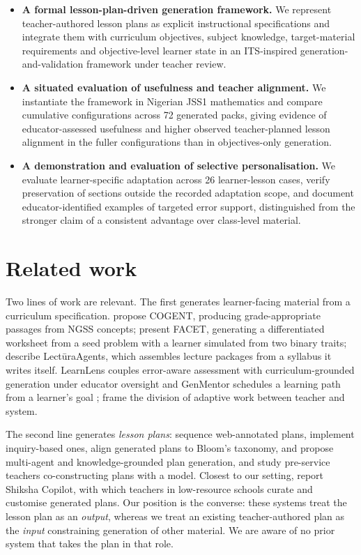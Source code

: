 \documentclass{article}
\begin{document}
\begin{itemize}\itemsep2pt
\item \textbf{A formal lesson-plan-driven generation framework.} We represent teacher-authored
lesson plans as explicit instructional specifications and integrate them with curriculum
objectives, subject knowledge, target-material requirements and objective-level learner state in
an ITS-inspired generation-and-validation framework under teacher review.
\item \textbf{A situated evaluation of usefulness and teacher alignment.} We instantiate the
framework in Nigerian JSS1 mathematics and compare cumulative configurations across 72 generated
packs, giving evidence of educator-assessed usefulness and higher observed teacher-planned
lesson alignment in the fuller configurations than in objectives-only generation.
\item \textbf{A demonstration and evaluation of selective personalisation.} We evaluate
learner-specific adaptation across 26 learner-lesson cases, verify preservation of sections
outside the recorded adaptation scope, and document educator-identified examples of targeted
error support, distinguished from the stronger claim of a consistent advantage over class-level
material.
\end{itemize}

\section{Related work}

Two lines of work are relevant. The first generates learner-facing material from a curriculum
specification. \citet{cogent} propose COGENT, producing grade-appropriate passages from NGSS
concepts; \citet{facet} present FACET, generating a differentiated worksheet from a seed problem
with a learner simulated from two binary traits; \citet{lectura} describe Lect\=uraAgents, which
assembles lecture packages from a syllabus it writes itself. LearnLens couples error-aware
assessment with curriculum-grounded generation under educator oversight \citep{zhao2025} and
GenMentor schedules a learning path from a learner's goal \citep{wang2025};
\citet{holstein2020} frame the division of adaptive work between teacher and system.

The second line generates \emph{lesson plans}: \citet{ranawat2021} sequence web-annotated
plans, \citet{moundridou2024} implement inquiry-based ones, \citet{olaniyan2025} align generated
plans to Bloom's taxonomy, \citet{zhang2025} and \citet{zheng2025} propose multi-agent and
knowledge-grounded plan generation, and \citet{celik2026} study pre-service teachers
co-constructing plans with a model. Closest to our setting, \citet{dennison2026} report Shiksha
Copilot, with which teachers in low-resource schools curate and customise generated plans. Our
position is the converse: these systems treat the lesson plan as an \emph{output}, whereas we
treat an existing teacher-authored plan as the \emph{input} constraining generation of other
material. We are aware of no prior system that takes the plan in that role.
\end{document}
